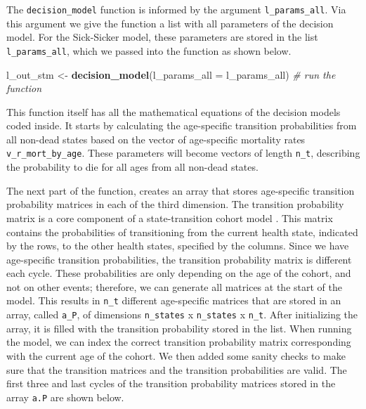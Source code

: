 \documentclass[]{book}
\newenvironment{Shaded}{\begin{snugshade}}{\end{snugshade}}
\newcommand{\KeywordTok}[1]{\textcolor[rgb]{0.13,0.29,0.53}{\textbf{#1}}}
\newcommand{\DataTypeTok}[1]{\textcolor[rgb]{0.13,0.29,0.53}{#1}}
\newcommand{\StringTok}[1]{\textcolor[rgb]{0.31,0.60,0.02}{#1}}
\newcommand{\CommentTok}[1]{\textcolor[rgb]{0.56,0.35,0.01}{\textit{#1}}}
\newcommand{\NormalTok}[1]{#1}
\begin{document}
The \texttt{decision\_model} function is informed by the argument
\texttt{l\_params\_all}. Via this argument we give the function a list
with all parameters of the decision model. For the Sick-Sicker model,
these parameters are stored in the list \texttt{l\_params\_all}, which
we passed into the function as shown below.

\begin{Shaded}
\begin{Highlighting}[]
\NormalTok{l_out_stm <-}\StringTok{ }\KeywordTok{decision_model}\NormalTok{(}\DataTypeTok{l_params_all =}\NormalTok{ l_params_all) }\CommentTok{# run the function}
\end{Highlighting}
\end{Shaded}

This function itself has all the mathematical equations of the decision
models coded inside. It starts by calculating the age-specific
transition probabilities from all non-dead states based on the vector of
age-specific mortality rates \texttt{v\_r\_mort\_by\_age}. These
parameters will become vectors of length \texttt{n\_t}, describing the
probability to die for all ages from all non-dead states.

The next part of the function, creates an array that stores age-specific
transition probability matrices in each of the third dimension. The
transition probability matrix is a core component of a state-transition
cohort model \citep{Iskandar2018}. This matrix contains the
probabilities of transitioning from the current health state, indicated
by the rows, to the other health states, specified by the columns. Since
we have age-specific transition probabilities, the transition
probability matrix is different each cycle. These probabilities are only
depending on the age of the cohort, and not on other events; therefore,
we can generate all matrices at the start of the model. This results in
\texttt{n\_t} different age-specific matrices that are stored in an
array, called \texttt{a\_P}, of dimensions \texttt{n\_states} x
\texttt{n\_states} x \texttt{n\_t}. After initializing the array, it is
filled with the transition probability stored in the list. When running
the model, we can index the correct transition probability matrix
corresponding with the current age of the cohort. We then added some
sanity checks to make sure that the transition matrices and the
transition probabilities are valid. The first three and last cycles of
the transition probability matrices stored in the array \texttt{a.P} are
shown below.
\end{document}
